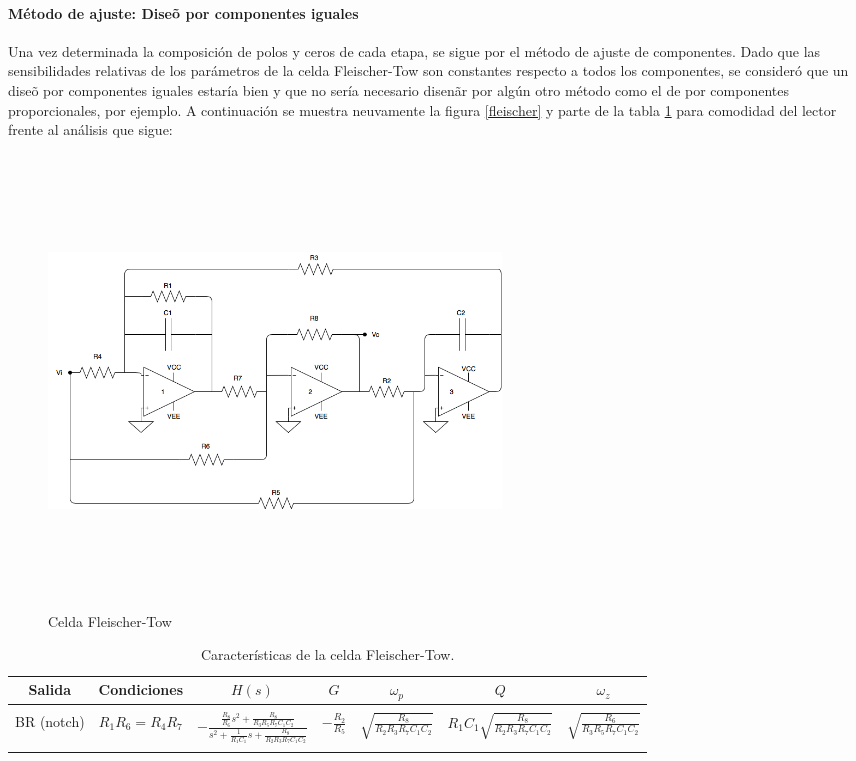 \paragraph{M\'etodo de ajuste: Dise\~o  por componentes iguales}

Una vez determinada la composici\'on de polos y ceros de cada etapa, se sigue por el m\'etodo de ajuste de componentes. Dado que las sensibilidades relativas de los par\'ametros de la celda Fleischer-Tow son constantes respecto a todos los componentes, se consider\'o que un dise\~o por componentes iguales estar\'ia bien y que no ser\'ia necesario disen\~ar por alg\'un otro m\'etodo como el de por componentes proporcionales, por ejemplo. A continuaci\'on se muestra neuvamente la figura \ref{fleischer} y parte de la tabla \ref*{f_cars} para comodidad del lector frente al an\'alisis que sigue:

 \begin{figure}[H] %
	\centering
	\includegraphics[width=12cm,height=12cm,keepaspectratio]{../EJ4/imagenes/FLEISCHER.png}
	\caption{Celda Fleischer-Tow}
	\label{fleischer2}
\end{figure}

\begin{table}[H] %
	\centering
	\begin{tabular}{c c c c c c c}
		Salida & Condiciones & $H(s)$ & $G$ & $\omega_p$ & $Q$ & $\omega_z$\\
		\hline \\
		BR (notch) &$R_1R_6=R_4R_7$ &\multirow{2}{*}{$- \frac{\frac{R_8}{R_6}s^2+\frac{R_8}{R_3R_5R_7C_1C_2}}{s^2+\frac{1}{R_1C_1}s+\frac{R_8}{R_2R_3R_7C_1C_2}}$}&\multirow{2}{*}{$-\frac{R_2}{R_5}$}& \multirow{2}{*}{$\sqrt{\frac{R_8}{R_2R_3R_7C_1C_2}}$}&
		\multirow{2}{*}{$R_1C_1\sqrt{\frac{R_8}{R_2R_3R_7C_1C_2}}$}
		&\multirow{2}{*}{$\sqrt{\frac{R_6}{R_3 R_5 R_7 C_1 C_2}}$}\\ \\ \\
		\hline
	\end{tabular}
	\caption{Caracter\'isticas de la celda Fleischer-Tow.}
	\label{f_cars}
\end{table}

